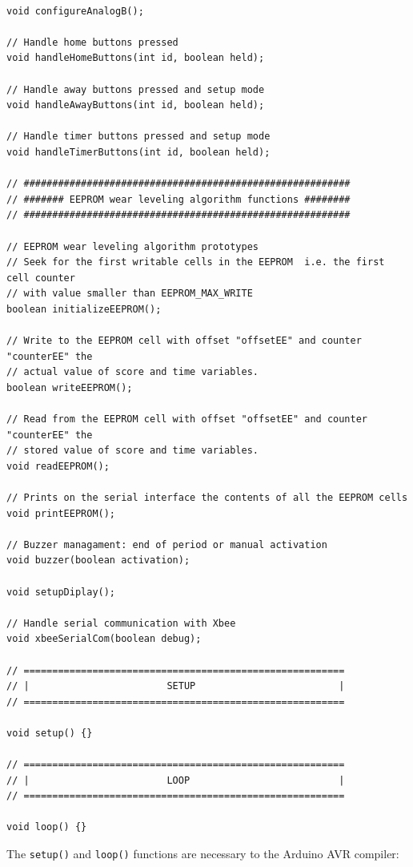 \documentclass[11pt,english]{article}
\newcommand{\code}[1]{\texttt{#1}}
\begin{document}
%
\begin{lstlisting}[label=lis:main-structure,caption=Main program structure]

void configureAnalogB();

// Handle home buttons pressed
void handleHomeButtons(int id, boolean held);

// Handle away buttons pressed and setup mode
void handleAwayButtons(int id, boolean held);

// Handle timer buttons pressed and setup mode
void handleTimerButtons(int id, boolean held);

// #########################################################
// ####### EEPROM wear leveling algorithm functions ########
// #########################################################

// EEPROM wear leveling algorithm prototypes
// Seek for the first writable cells in the EEPROM  i.e. the first cell counter
// with value smaller than EEPROM_MAX_WRITE
boolean initializeEEPROM();

// Write to the EEPROM cell with offset "offsetEE" and counter "counterEE" the
// actual value of score and time variables.
boolean writeEEPROM();

// Read from the EEPROM cell with offset "offsetEE" and counter "counterEE" the
// stored value of score and time variables.
void readEEPROM();

// Prints on the serial interface the contents of all the EEPROM cells
void printEEPROM();

// Buzzer managament: end of period or manual activation
void buzzer(boolean activation);

void setupDiplay();

// Handle serial communication with Xbee
void xbeeSerialCom(boolean debug);

// ========================================================
// |                        SETUP                         |
// ========================================================

void setup() {} 

// ========================================================
// |                        LOOP                          |
// ========================================================

void loop() {}
\end{lstlisting}

The \code{setup()} and \code{loop()} functions are necessary to the Arduino AVR compiler: 
\end{document}

